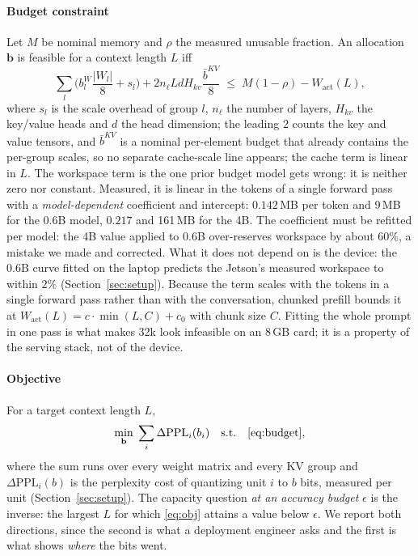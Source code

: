 \documentclass[10pt,journal]{IEEEtran}
\newcommand{\rhoSym}{\rho}
\begin{document}
\paragraph*{Budget constraint}
Let $M$ be nominal memory and $\rhoSym$ the measured unusable fraction. An
allocation $\mathbf b$ is feasible for a context length $L$ iff
\begin{equation}
\sum_{l} \Big( b^{W}_l \frac{|W_l|}{8} + s_l \Big)
+ 2 n_{\ell} L d H_{kv} \frac{\bar b^{KV}}{8}
\;\le\; M(1-\rhoSym) - W_{\mathrm{act}}(L),
\label{eq:budget}
\end{equation}
where $s_l$ is the scale overhead of group $l$, $n_{\ell}$ the number of layers, $H_{kv}$ the key/value heads and $d$ the head dimension; the leading $2$ counts the key and value tensors, and $\bar b^{KV}$ is a nominal per-element budget that already contains the per-group scales, so no separate cache-scale line appears; the cache term is linear in $L$. The
workspace term is the one prior budget model gets wrong: it is neither zero nor
constant. Measured, it is linear in the tokens of a single forward pass with a
\emph{model-dependent} coefficient and intercept: $0.142$\,MB per token and
9\,MB for the 0.6B model, $0.217$ and 161\,MB for the 4B. The coefficient must
be refitted per model: the 4B value applied to 0.6B over-reserves workspace by
about $60\%$, a mistake we made and corrected. What it does not depend on is the device: the 0.6B curve
fitted on the laptop predicts the Jetson's measured workspace to within $2\%$
(Section~\ref{sec:setup}). Because the term scales with the tokens in a single
forward pass rather than with the conversation, chunked prefill bounds it at
$W_{\mathrm{act}}(L) = c \cdot \min(L, C) + c_0$ with chunk size $C$. Fitting the
whole prompt in one pass is what makes 32k look infeasible on an 8\,GB card; it
is a property of the serving stack, not of the device.

\paragraph*{Objective}
For a target context length $L$,
\begin{equation}
\min_{\mathbf b} \; \sum_i \Delta\mathrm{PPL}_i(b_i)
\quad \text{s.t.} \quad \eqref{eq:budget},
\label{eq:obj}
\end{equation}
where the sum runs over every weight matrix and every KV group and
$\Delta\mathrm{PPL}_i(b)$ is the perplexity cost of quantizing unit $i$ to $b$
bits, measured per unit (Section~\ref{sec:setup}). The capacity question
\emph{at an accuracy budget} $\epsilon$ is the inverse: the largest $L$ for which
\eqref{eq:obj} attains a value below $\epsilon$. We report both directions, since
the second is what a deployment engineer asks and the first is what shows
\emph{where} the bits went.
\end{document}
